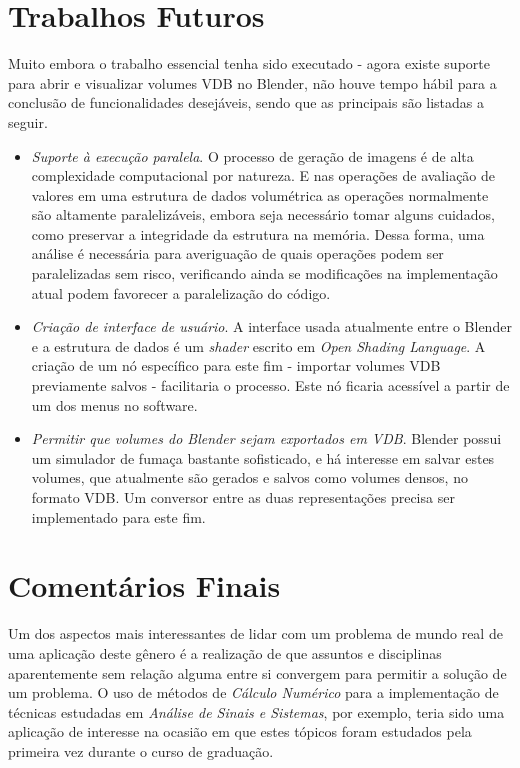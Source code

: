 \section{Trabalhos Futuros}

Muito embora o trabalho essencial tenha sido executado - agora existe suporte para abrir e visualizar volumes VDB no Blender, não houve tempo hábil para a conclusão de funcionalidades desejáveis, sendo que as principais são listadas a seguir.

\begin{itemize}
\item \emph{Suporte à execução paralela}.
O processo de geração de imagens é de alta complexidade computacional por natureza. E nas operações de avaliação de valores em uma estrutura de dados volumétrica as operações normalmente são altamente paralelizáveis, embora seja necessário tomar alguns cuidados, como preservar a integridade da estrutura na memória. Dessa forma, uma análise é necessária para averiguação de quais operações podem ser paralelizadas sem risco, verificando ainda se modificações na implementação atual podem favorecer a paralelização do código.

\item \emph{Criação de interface de usuário}. A interface usada atualmente entre o Blender e a estrutura de dados é um {\it shader} escrito em \emph{Open Shading Language}. A criação de um nó específico para este fim - importar volumes VDB previamente salvos - facilitaria o processo. Este nó ficaria acessível a partir de um dos menus no software.

\item \emph{Permitir que volumes do Blender sejam exportados em VDB}. Blender possui um simulador de fumaça bastante sofisticado, e há interesse em salvar estes volumes, que atualmente são gerados e salvos como volumes densos, no formato VDB. Um conversor entre as duas representações precisa ser implementado para este fim.

\end{itemize}

\section{Comentários Finais}

Um dos aspectos mais interessantes de lidar com um problema de mundo real de uma aplicação deste gênero é a realização de que assuntos e disciplinas aparentemente sem relação alguma entre si convergem para permitir a solução de um problema. O uso de métodos de \emph{Cálculo Numérico} para a implementação de técnicas estudadas em \emph{Análise de Sinais e Sistemas}, por exemplo, teria sido uma aplicação de interesse na ocasião em que estes tópicos foram estudados pela primeira vez durante o curso de graduação. \\

